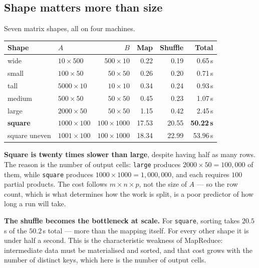 \documentclass[11pt,a4paper]{article}
\begin{document}
\subsection{Shape matters more than size}

Seven matrix shapes, all on four machines.

\begin{center}\small
\begin{tabular}{@{}llrrrr@{}}
\toprule
\textbf{Shape} & \textbf{$A$} & \textbf{$B$} & \textbf{Map} & \textbf{Shuffle} & \textbf{Total} \\
\midrule
wide          & $10 \times 500$   & $500 \times 10$   & \phantom{0}0.22 & \phantom{0}0.19 & \phantom{0}0.65\,s \\
small         & $100 \times 50$   & $50 \times 50$    & \phantom{0}0.26 & \phantom{0}0.20 & \phantom{0}0.71\,s \\
tall          & $5000 \times 10$  & $10 \times 10$    & \phantom{0}0.34 & \phantom{0}0.24 & \phantom{0}0.93\,s \\
medium        & $500 \times 50$   & $50 \times 50$    & \phantom{0}0.45 & \phantom{0}0.23 & \phantom{0}1.07\,s \\
large         & $2000 \times 50$  & $50 \times 50$    & \phantom{0}1.15 & \phantom{0}0.42 & \phantom{0}2.45\,s \\
\textbf{square} & $1000 \times 100$ & $100 \times 1000$ & 17.53 & 20.55 & \textbf{50.22\,s} \\
square uneven & $1001 \times 100$ & $100 \times 1000$ & 18.34 & 22.99 & 53.96\,s \\
\bottomrule
\end{tabular}
\end{center}

\textbf{Square is twenty times slower than large}, despite having half as many
rows. The reason is the number of output cells: \texttt{large} produces
$2000 \times 50 = 100{,}000$ of them, while \texttt{square} produces
$1000 \times 1000 = 1{,}000{,}000$, and each requires $100$ partial products.
The cost follows $m \times n \times p$, not the size of $A$ --- so the row count,
which is what determines how the work is split, is a poor predictor of how long
a run will take.

\textbf{The shuffle becomes the bottleneck at scale.} For \texttt{square},
sorting takes $20.5$\,s of the $50.2$\,s total --- more than the mapping itself.
For every other shape it is under half a second. This is the characteristic
weakness of MapReduce: intermediate data must be materialised and sorted, and
that cost grows with the number of distinct keys, which here is the number of
output cells.
\end{document}
